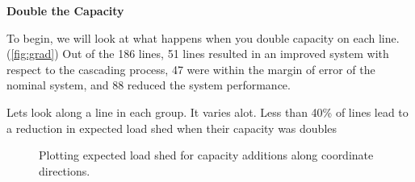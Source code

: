 \textbf{Double the Capacity}

To begin, we will look at what happens when you double capacity on each line.  (\ref{fig:grad})  Out of the 186 lines, 51 lines resulted in an improved system with respect to the cascading process, 47 were within the margin of error of the nominal system, and 88 reduced the system performance.


\begin{figure}

\end{figure}

Lets look along a line in each group.  It varies alot.  Less than 40\% of lines lead to a reduction in expected load shed when their capacity was doubles 


\begin{figure}

	\caption{Plotting expected load shed for capacity additions along coordinate directions.  }
\end{figure}
